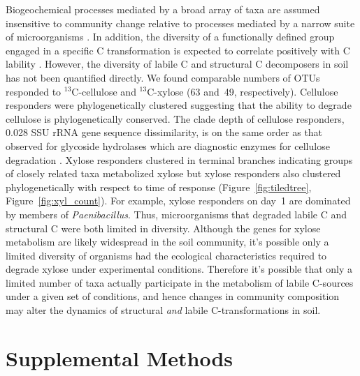 \documentclass{article}
\begin{document}
Biogeochemical processes mediated by a broad array of taxa are assumed
insensitive to community change relative to
processes mediated by a narrow suite of microorganisms
\citep{Schimel_1995,McGuire2010}. In addition, the diversity of
a functionally defined group engaged in a specific C transformation is
expected to correlate positively with C lability \citep{McGuire2010}.
However, the diversity of labile C and structural C decomposers in soil
has not been quantified directly. We found comparable numbers of OTUs
responded to $^{13}$C-cellulose and $^{13}$C-xylose (63 and~49,
respectively). Cellulose responders were phylogenetically clustered
suggesting that the ability to degrade cellulose is phylogenetically
conserved. The clade depth of cellulose responders, 0.028 SSU rRNA gene
sequence dissimilarity, is on the same order as that observed for
glycoside hydrolases which are diagnostic enzymes for cellulose
degradation \citep{Berlemont2013}. Xylose responders clustered in terminal
branches indicating groups of closely related taxa metabolized xylose but
xylose responders also clustered phylogenetically with respect to time of
response (Figure~\ref{fig:tiledtree}, Figure~\ref{fig:xyl_count}).
For example, xylose responders on day~1 are dominated by members of
\textit{Paenibacillus}. Thus, microorganisms that degraded labile C and
structural C were both limited in diversity. Although the genes for xylose
metabolism are likely widespread in the soil community, it's possible only
a limited diversity of organisms had the ecological characteristics
required to degrade xylose under experimental conditions. Therefore it's
possible that only a limited number of taxa actually participate in the
metabolism of labile C-sources under a given set of conditions, and hence
changes in community composition may alter the dynamics of structural
\textit{and} labile C-transformations in soil.

\section{Supplemental Methods} 
\end{document}
